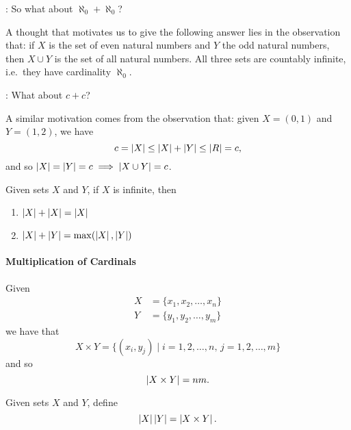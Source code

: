 \documentclass[notoc,notitlepage]{tufte-book}
\begin{document}
: So what about $\aleph_0 + \aleph_0$?

A thought that motivates us to give the following answer lies in the observation that: if $X$ is the set of even natural numbers and $Y$ the odd natural numbers, then $X \cup Y$ is the set of all natural numbers. All three sets are countably infinite, i.e.\ they have cardinality $\aleph_0$.

: What about $c + c$?

A similar motivation comes from the observation that: given $X = (0, 1)$ and $Y = (1, 2)$, we have
\begin{equation*}
  c = \left|X\right| \leq \left|X\right| + \left|Y\right| \leq \left|R\right| = c,
\end{equation*}
and so $\left|X\right| = \left|Y\right| = c \implies \left|X \cup Y\right| = c$.

\begin{thm}\label{thm:sums_of_cardinals}
  Given sets $X$ and $Y$, if $X$ is infinite, then
  \begin{enumerate}
    \item $\left|X\right| + \left|X\right| = \left|X\right|$
    \item $\left|X\right| + \left|Y\right| = \max( \left|X\right|, \left|Y\right| )$
  \end{enumerate}
\end{thm}

\paragraph{Multiplication of Cardinals} Given
\begin{align*}
  X &= \{ x_1, x_2, \ldots, x_n \} \\
  Y &= \{ y_1, y_2, \ldots, y_m \}
\end{align*}
we have that
\begin{equation*}
  X \times Y = \{ (x_i, y_j) \mid i = 1, 2, \ldots, n, \, j = 1, 2, \ldots, m \}
\end{equation*}
and so
\begin{equation*}
  \left|X \times Y\right| = nm.
\end{equation*}

\begin{defn}\label{defn:multiplication_of_cardinals}
  Given sets $X$ and $Y$, define
  \begin{equation*}
    \left|X\right| \left|Y\right| = \left|X \times Y\right|.
  \end{equation*}
\end{defn}
\end{document}
